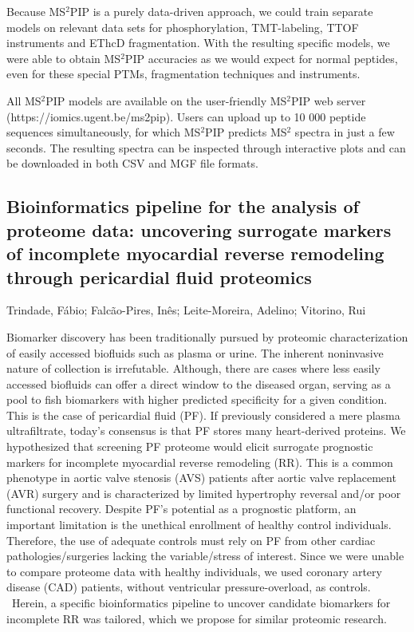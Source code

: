 {Because MS$^2$PIP is a purely data-driven approach, we could train separate models on relevant data sets for phosphorylation, TMT-labeling, TTOF instruments and EThcD fragmentation. With the resulting specific models, we were able to obtain MS$^2$PIP accuracies as we would expect for normal peptides, even for these special PTMs, fragmentation techniques and instruments.

All MS$^2$PIP models are available on the user-friendly MS$^2$PIP web server (https://iomics.ugent.be/ms2pip). Users can upload up to 10 000 peptide sequences simultaneously, for which MS$^2$PIP predicts MS$^2$ spectra in just a few seconds. The resulting spectra can be inspected through interactive plots and can be downloaded in both CSV and MGF file formats.


\subsection*{\color{eubicRed} Bioinformatics pipeline for the analysis of proteome data: uncovering surrogate markers of incomplete myocardial reverse remodeling through pericardial fluid proteomics}
{\color{eubicGray}Trindade, Fábio;
Falcão-Pires, Inês;
Leite-Moreira, Adelino;
Vitorino, Rui}

Biomarker discovery has been traditionally pursued by proteomic characterization of easily accessed biofluids such as plasma or urine. The inherent noninvasive nature of collection is irrefutable. Although, there are cases where less easily accessed biofluids can offer a direct window to the diseased organ, serving as a pool to fish biomarkers with higher predicted specificity for a given condition. This is the case of pericardial fluid (PF). If previously considered a mere plasma ultrafiltrate, today’s consensus is that PF stores many heart-derived proteins. We hypothesized that screening PF proteome would elicit surrogate prognostic markers for incomplete myocardial reverse remodeling (RR). This is a common phenotype in aortic valve stenosis (AVS) patients after aortic valve replacement (AVR) surgery and is characterized by limited hypertrophy reversal and/or poor functional recovery. Despite PF’s potential as a prognostic platform, an important limitation is the unethical enrollment of healthy control individuals. Therefore, the use of adequate controls must rely on PF from other cardiac pathologies/surgeries lacking the variable/stress of interest. Since we were unable to compare proteome data with healthy individuals, we used coronary artery disease (CAD) patients, without ventricular pressure-overload, as controls.  Herein, a specific bioinformatics pipeline to uncover candidate biomarkers for incomplete RR was tailored, which we propose for similar proteomic research.

}
